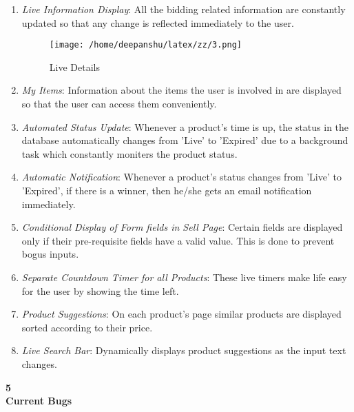 \documentclass[a4paper,12pt]{article}
\begin{document}
{{\begin{enumerate}
\item 
\textit{Live Information Display}: All the bidding related information are constantly updated so that any change is reflected immediately to the user. \\


\begin{figure}[ht!]
\centering
\texttt{[image: /home/deepanshu/latex/zz/3.png]}
\caption{Live Details \label{overflow}}
\end{figure}



\item 
\textit{My Items}: Information about the items the user is involved in are displayed so that the user can access them conveniently. \\

\item 
\textit{Automated Status Update}: Whenever a product's time is up, the status in the database automatically changes from 'Live' to 'Expired' due to a background task which constantly moniters the product status. \\ 

\item 
\textit{Automatic Notification}: Whenever a product's status changes from 'Live' to 'Expired', if there is a winner, then he/she gets an email notification immediately. \\

\item 
\textit{Conditional Display of Form fields in Sell Page}: Certain fields are displayed only if their pre-requisite fields have a valid value. This is done to prevent bogus inputs.

\item 
\textit{Separate Countdown Timer for all Products}: These live timers make life easy for the user by showing the time left. \\

\item 
\textit{Product Suggestions}: On each product's page similar products are displayed sorted according to their price. \\

\item
\textit{Live Search Bar}: Dynamically displays product suggestions as the input text changes. \\
\end{enumerate}


\huge{\textbf{5 \\ Current Bugs}} \vspace{12pt}

}}
\end{document}
